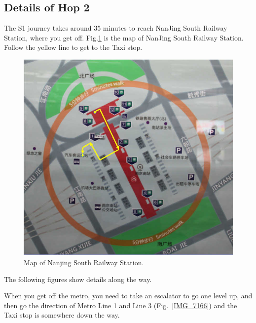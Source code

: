 \documentclass[11pt]{article}
\begin{document}
\clearpage

\subsection{Details of Hop 2}

The S1 journey takes around 35 minutes to reach NanJing South Railway Station, where you get off.
Fig.\ref{ggg} is the map of NanJing South Railway Station. Follow the yellow line to get to the Taxi stop.
\begin{figure}[!h]
    \centering
    	\includegraphics[scale=0.4]{ggg.jpg}
    	\caption{Map of Nanjing South Railway Station.\label{ggg}}
 \end{figure}

The following figures show details along the way.

When you get off the metro, you need to take an escalator to go one level up, and then go the direction of Metro Line 1 and Line 3 (Fig.~\ref{IMG_7166}) and the Taxi stop is somewhere down the way.

\end{document}
